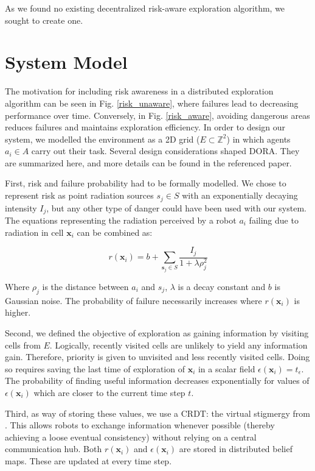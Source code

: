 As we found no existing decentralized risk-aware exploration algorithm, we sought to create one.


\section{System Model}
\label{dora_system_model}

The motivation for including risk awareness in a distributed exploration algorithm can be seen in Fig. \ref{risk_unaware}, where failures lead to decreasing performance over time. Conversely, in Fig. \ref{risk_aware}, avoiding dangerous areas reduces failures and maintains exploration efficiency. In order to design our system, we modelled the environment as a 2D grid ($E \subset \mathbb{Z}^2$) in which agents $a_i \in A$ carry out their task. Several design considerations shaped \ac{DORA}. They are summarized here, and more details can be found in the referenced paper.

\FloatBarrier

First, risk and failure probability had to be formally modelled. We chose to represent risk as point radiation sources $s_j \in S$ with an exponentially decaying intensity $I_j$, but any other type of danger could have been used with our system. The equations representing the radiation perceived by a robot $a_i$ failing due to radiation in cell $\bm{x}_i$ can be combined as:

\begin{equation}
    r(\bm{x}_i) = b + \sum_{\bm{s}_j \in S} \frac{I_j}{1 + \lambda\rho_j^2}
    \label{eq:radiation_dora}
\end{equation}

Where $\rho_j$ is the distance between $a_i$ and $s_j$, $\lambda$ is a decay constant and $b$ is Gaussian noise. The probability of failure necessarily increases where $r(\bm{x}_i)$ is higher.

Second, we defined the objective of exploration as gaining information by visiting cells from $E$. Logically, recently visited cells are unlikely to yield any information gain. Therefore, priority is given to unvisited and less recently visited cells. Doing so requires saving the last time of exploration of $\bm{x}_i$ in a scalar field $\epsilon(\bm{x}_i) = t_\epsilon$. The probability of finding useful information decreases exponentially for values of $\epsilon(\bm{x}_i)$ which are closer to the current time step $t$.

Third, as way of storing these values, we use a \ac{CRDT}: the virtual stigmergy from \cite{pinciroliTuple2016}. This allows robots to exchange information whenever possible (thereby achieving a loose eventual consistency) without relying on a central communication hub. Both $r(\bm{x}_i)$ and $\epsilon(\bm{x}_i)$ are stored in distributed belief maps. These are updated at every time step.

